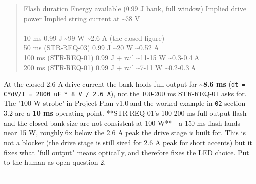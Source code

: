 \documentclass[11pt,a4paper]{article}
\begin{document}
\begin{quote}\small\ttfamily\raggedright
\textbar{} Flash duration \textbar{} Energy available (0.99 J bank, full window) \textbar{} Implied drive power \textbar{} Implied string current at \textasciitilde{}38 V \textbar{}\\
\textbar{}---\textbar{}---\textbar{}---\textbar{}---\textbar{}\\
\textbar{} 10 ms \textbar{} 0.99 J \textbar{} \textasciitilde{}99 W \textbar{} \textasciitilde{}2.6 A (the closed figure) \textbar{}\\
\textbar{} 50 ms (STR-REQ-03) \textbar{} 0.99 J \textbar{} \textasciitilde{}20 W \textbar{} \textasciitilde{}0.52 A \textbar{}\\
\textbar{} 100 ms (STR-REQ-01) \textbar{} 0.99 J + rail \textbar{} \textasciitilde{}11-15 W \textbar{} \textasciitilde{}0.3-0.4 A \textbar{}\\
\textbar{} 200 ms (STR-REQ-01) \textbar{} 0.99 J + rail \textbar{} \textasciitilde{}7-11 W \textbar{} \textasciitilde{}0.2-0.3 A \textbar{}
\end{quote}
At the closed 2.6 A drive current the bank holds full output for \textbf{\textasciitilde{}8.6 ms} (\texttt{dt = C{*}dV/I = 2800 uF {*} 8 V / 2.6 A}), not the 100-200 ms STR-REQ-01 asks for. The "100 W strobe" in Project Plan v1.0 and the worked example in \texttt{02} section 3.2 are a \textbf{10 ms} operating point. {*}{*}STR-REQ-01's 100-200 ms full-output flash and the closed bank size are not consistent at 100 W{*}{*} - a 150 ms flash lands near 15 W, roughly 6x below the 2.6 A peak the drive stage is built for. This is not a blocker (the drive stage is still sized for 2.6 A peak for short accents) but it fixes what "full output" means optically, and therefore fixes the LED choice. Put to the human as open question 2.

---
\end{document}
